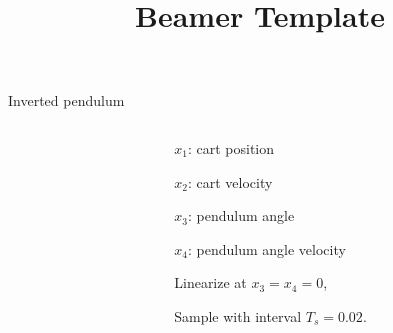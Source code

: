 \documentclass{beamer}
\title{Beamer Template}
\author{}
\begin{document}
\begin{frame}{Inverted pendulum}
   \centering
   \begin{columns}
   	\begin{column}{0.5\textwidth}
   		\scalebox{0.7}{}
   	\end{column}
   \begin{column}{0.5\textwidth}
   	$x_1$: cart position
   	
   	$x_2$: cart velocity
   	
   	$x_3$: pendulum angle
   	
   	$x_4$: pendulum angle velocity
   	
   	Linearize at $x_3=x_4=0$, 
   	
   	Sample with interval $T_s=0.02$.
   \end{column}
   \end{columns}
   

\end{frame}
\end{document}
